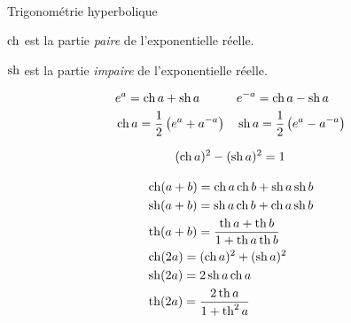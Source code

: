 \begin{center}
\hrulefill \\ 
 Trigonométrie hyperbolique
\end{center}

$\ch$ est la partie \emph{paire} de l'exponentielle réelle.

$\sh$ est la partie \emph{impaire} de l'exponentielle réelle.

\begin{align*}
 &e^{a} = \ch a + \sh a &  &e^{-a} = \ch a - \sh a \\
 &\ch a = \frac{1}{2}\left( e^a + a^{-a}\right)  & & \sh a = \frac{1}{2}\left( e^a - a^{-a}\right)
\end{align*}

\begin{displaymath}
 (\ch a)^2 - (\sh a)^2 = 1
\end{displaymath}

\begin{align*}
 &\ch(a+b) = \ch a \ch b  + \sh a \sh b\\
 &\sh(a+b) = \sh a \ch b + \ch a \sh b \\
 &\th(a+b) = \frac{\th a + \th b}{1+\th a \th b}\\
 &\ch(2a) = (\ch a)^2 + (\sh a)^2 \\
 &\sh(2a) = 2\sh a \ch a \\
 &\th(2a) = \frac{2\th a }{1+\th^2 a}
\end{align*}

\onecolumn
\clearpage
